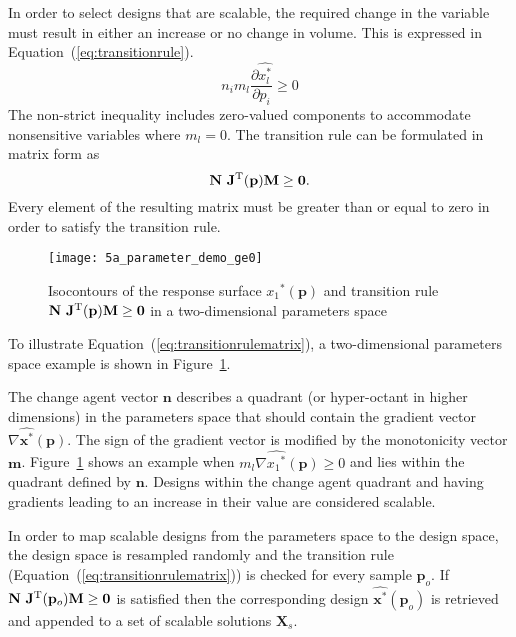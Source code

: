 In order to select designs that are scalable, the required change in the variable must result in either an increase or no change in volume. This is expressed in Equation~(\ref{eq:transitionrule}). 
\begin{equation}
	n_i m_l\dfrac{\partial \hat{x_l^*}}{\partial p_i} \ge 0 \label{eq:transitionrule}
\end{equation}
The non-strict inequality includes zero-valued components to accommodate nonsensitive variables where $m_l = 0$. The transition rule can be formulated in matrix form as 
\begin{equation}
		\mathbf{N}~\mathbf{J}^{\text T}(\mathbf{p})\mathbf{M} \ge \mathbf{0}.
		 \label{eq:transitionrulematrix}
\end{equation}
Every element of the resulting matrix must be greater than or equal to zero in order to satisfy the transition rule.

\begin{figure}[h!]
	\centering
	\texttt{[image: 5a\_parameter\_demo\_ge0]}
	\caption{Isocontours of the response surface ${x_1}^*(\mathbf{p})$ and transition rule $\mathbf{N}~\mathbf{J}^{\text T}(\mathbf{p})\mathbf{M} \ge \mathbf{0}$ in a two-dimensional parameters space}
	\label{fig:contourdemo}
\end{figure}

To illustrate Equation~(\ref{eq:transitionrulematrix}), a two-dimensional parameters space example is shown in Figure~\ref{fig:contourdemo}. 

The change agent vector $\mathbf{n}$ describes a quadrant (or hyper-octant in higher dimensions) in the parameters space that should contain the gradient vector $\nabla\hat{\mathbf{x}^*}(\mathbf{p})$. The sign of the gradient vector is modified by the monotonicity vector $\mathbf{m}$. Figure~\ref{fig:contourdemo} shows an example when $m_l\nabla\hat{{x_1}^*}(\mathbf{p}) \ge 0$ and lies within the quadrant defined by $\mathbf{n}$. Designs within the change agent quadrant and having gradients leading to an increase in their value are considered scalable.

In order to map scalable designs from the parameters space to the design space, the design space is resampled randomly and the transition rule (Equation~(\ref{eq:transitionrulematrix})) is checked for every sample $\mathbf{p}_o$. If $\mathbf{N}~\mathbf{J}^{\text T}(\mathbf{p}_o)\mathbf{M} \ge \mathbf{0}$ is satisfied then the corresponding design $\hat{\mathbf{x}^*}(\mathbf{p}_o)$ is retrieved and appended to a set of scalable solutions $\mathbf{X}_s$.


